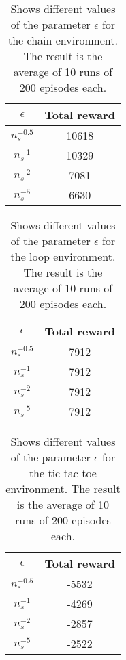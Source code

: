 \documentclass[11pt]{article}
\numberwithin{equation}{section}
\begin{document}
\begin{flushleft}
\begin{table}[H]
\caption{Shows different values of the parameter $\epsilon$ for the chain environment. The result is the average of 10 runs of 200 episodes each.}
\begin{center}
\begin{tabular}{|c|c|}
\hline
$\epsilon$ & Total reward \\ \hline
$n_s^{-0.5}$ & 10618 \\ \hline
$n_s^{-1}$ & 10329 \\ \hline
$n_s^{-2}$ & 7081 \\ \hline
$n_s^{-5}$ & 6630 \\
\hline
\end{tabular}
\label{tab:chainMean}
\end{center}
\end{table}

\begin{table}[H]
\caption{Shows different values of the parameter $\epsilon$ for the loop environment. The result is the average of 10 runs of 200 episodes each.}
\begin{center}
\begin{tabular}{|c|c|}
\hline
$\epsilon$ & Total reward \\ \hline
$n_s^{-0.5}$ & 7912 \\ \hline
$n_s^{-1}$ & 7912 \\ \hline
$n_s^{-2}$ & 7912 \\ \hline
$n_s^{-5}$ & 7912 \\
\hline
\end{tabular}
\label{tab:loopMean}
\end{center}
\end{table}

\begin{table}[H]
\caption{Shows different values of the parameter $\epsilon$ for the tic tac toe environment. The result is the average of 10 runs of 200 episodes each.}
\begin{center}
\begin{tabular}{|c|c|}
\hline
$\epsilon$ & Total reward \\ \hline
$n_s^{-0.5}$ & -5532 \\ \hline
$n_s^{-1}$ & -4269 \\ \hline
$n_s^{-2}$ & -2857 \\ \hline
$n_s^{-5}$ & -2522 \\
\hline
\end{tabular}
\label{tab:tttMean}
\end{center}
\end{table}


\end{flushleft}
\end{document}
